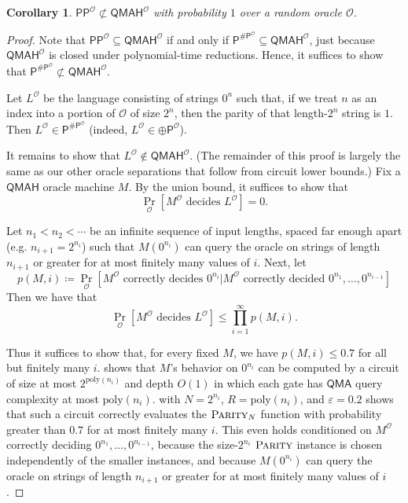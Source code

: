 \documentclass[10pt,a4paper]{article}
\newtheorem{corollary}[theorem]{Corollary}
\newcommand{\eps}{\varepsilon}
\newcommand{\poly}{\mathrm{poly}}
\newcommand{\PARITY}{\normalfont\textsc{Parity}}
\begin{document}
\begin{corollary}
\label{cor:pp_not_in_qmah}
$\mathsf{PP}^\mathcal{O}\not \subset \mathsf{QMAH}^\mathcal{O}$ with probability $1$ over a random oracle $\mathcal{O}$.
\end{corollary}


\begin{proof}[Proof]
Note that $\mathsf{PP}^\mathcal{O} \subseteq \mathsf{QMAH}^\mathcal{O}$ if and only if $\mathsf{P}^{\mathsf{\# P}^\mathcal{O}} \subseteq \mathsf{QMAH}^\mathcal{O}$, just because $\mathsf{QMAH}^\mathcal{O}$ is closed under polynomial-time reductions. Hence, it suffices to show that $\mathsf{P}^{\mathsf{\# P}^\mathcal{O}} \not\subset \mathsf{QMAH}^\mathcal{O}$.

Let $L^\mathcal{O}$ be the language consisting of strings $0^n$ such that, if we treat $n$ as an index into a portion of $\mathcal{O}$ of size $2^n$, then the parity of that length-$2^n$ string is $1$. Then $L^\mathcal{O} \in \mathsf{P}^{\mathsf{\# P}^\mathcal{O}}$ (indeed, $L^\mathcal{O} \in \mathsf{\oplus P}^\mathcal{O}$).

It remains to show that $L^\mathcal{O} \not\in \mathsf{QMAH}^\mathcal{O}$. (The remainder of this proof is largely the same as our other oracle separations that follow from circuit lower bounds.) Fix a $\mathsf{QMAH}$ oracle machine $M$. By the union bound, it suffices to show that
\[
\Pr_{\mathcal{O}}\left[M^\mathcal{O} \text{ decides } L^\mathcal{O}\right]=0.
\]

Let $n_1<n_2<\cdots$ be an infinite sequence of input lengths, spaced far enough apart (e.g. $n_{i+1}=2^{n_i}$) such that $M\left(0^{n_i}\right)$ can query the oracle on strings of length $n_{i+1}$ or greater for at most finitely many values of $i$. Next, let
\[
p(M,i)\coloneqq\Pr_{\mathcal{O}}\left[M^\mathcal{O} \text{ correctly decides } 0^{n_i}|M^\mathcal{O} \text{ correctly decided }0^{n_1},\dots,0^{n_{i-1}}\right]
\]
Then we have that
\[
\Pr_{\mathcal{O}}\left[M^\mathcal{O}\text{ decides }L^\mathcal{O}\right]\leq\prod_{i=1}^\infty p(M,i).
\]

\noindent Thus it suffices to show that, for every fixed $M$, we have $p(M,i)\leq 0.7$ for all but finitely many $i$.  shows that $M$'s behavior on $0^{n_i}$ can be computed by a circuit of size at most $2^{\poly(n_i)}$ and depth $O(1)$ in which each gate has $\mathsf{QMA}$ query complexity at most $\poly(n_i)$.  with $N = 2^{n_i}$, $R = \poly(n_i)$, and $\eps = 0.2$ shows that such a circuit correctly evaluates the $\PARITY_N$ function with probability greater than $0.7$ for at most finitely many $i$. This even holds conditioned on $M^\mathcal{O}$ correctly deciding $0^{n_1},\ldots,0^{n_{i-1}}$, because the size-$2^{n_i}$ $\PARITY$ instance is chosen independently of the smaller instances, and because $M\left(0^{n_i}\right)$ can query the oracle on strings of length $n_{i+1}$ or greater for at most finitely many values of $i$.
\end{proof}
\end{document}
